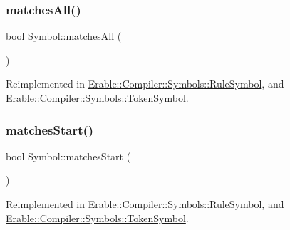 \subsubsection{\texorpdfstring{matchesAll()}{matchesAll()}}
{\footnotesize\ttfamily bool Symbol\+::matches\+All (\begin{DoxyParamCaption}\item[{Data\+::\+Data\+Deque}]{ }\end{DoxyParamCaption})\hspace{0.3cm}{\ttfamily [virtual]}}



Reimplemented in \mbox{\hyperlink{class_erable_1_1_compiler_1_1_symbols_1_1_rule_symbol_a690e797889b403487385955dc3fe7501}{Erable\+::\+Compiler\+::\+Symbols\+::\+Rule\+Symbol}}, and \mbox{\hyperlink{class_erable_1_1_compiler_1_1_symbols_1_1_token_symbol_a89e31223762aafe7f77d545595a6e4ef}{Erable\+::\+Compiler\+::\+Symbols\+::\+Token\+Symbol}}.

\mbox{\label{class_erable_1_1_compiler_1_1_symbols_1_1_symbol_a108a4a3e9b9a2785f14ed580e813a52a}} 
\subsubsection{\texorpdfstring{matchesStart()}{matchesStart()}}
{\footnotesize\ttfamily bool Symbol\+::matches\+Start (\begin{DoxyParamCaption}\item[{Data\+::\+Data\+Deque}]{ }\end{DoxyParamCaption})\hspace{0.3cm}{\ttfamily [virtual]}}



Reimplemented in \mbox{\hyperlink{class_erable_1_1_compiler_1_1_symbols_1_1_rule_symbol_a965c2e3ba84c2e93c5ebbce5003b721b}{Erable\+::\+Compiler\+::\+Symbols\+::\+Rule\+Symbol}}, and \mbox{\hyperlink{class_erable_1_1_compiler_1_1_symbols_1_1_token_symbol_a0bc1350eeca0c23ef97f454589734ede}{Erable\+::\+Compiler\+::\+Symbols\+::\+Token\+Symbol}}.

\mbox{\label{class_erable_1_1_compiler_1_1_symbols_1_1_symbol_af5ccb3fb3201fd88ab6ce0e495416c82}} 
